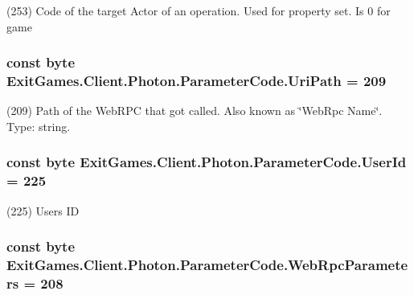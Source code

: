 (253) Code of the target Actor of an operation. Used for property set. Is 0 for game

\subsubsection[{\texorpdfstring{Uri\+Path}{UriPath}}]{\setlength{\rightskip}{0pt plus 5cm}const byte Exit\+Games.\+Client.\+Photon.\+Parameter\+Code.\+Uri\+Path = 209}\hypertarget{class_exit_games_1_1_client_1_1_photon_1_1_parameter_code_a2283a31554fd7e99130958b622aabb8e}{}\label{class_exit_games_1_1_client_1_1_photon_1_1_parameter_code_a2283a31554fd7e99130958b622aabb8e}


(209) Path of the Web\+R\+PC that got called. Also known as \char`\"{}\+Web\+Rpc Name\char`\"{}. Type\+: string.

\subsubsection[{\texorpdfstring{User\+Id}{UserId}}]{\setlength{\rightskip}{0pt plus 5cm}const byte Exit\+Games.\+Client.\+Photon.\+Parameter\+Code.\+User\+Id = 225}\hypertarget{class_exit_games_1_1_client_1_1_photon_1_1_parameter_code_a661b2eb09801e8a113253f52615bcb00}{}\label{class_exit_games_1_1_client_1_1_photon_1_1_parameter_code_a661b2eb09801e8a113253f52615bcb00}


(225) User\textquotesingle{}s ID

\subsubsection[{\texorpdfstring{Web\+Rpc\+Parameters}{WebRpcParameters}}]{\setlength{\rightskip}{0pt plus 5cm}const byte Exit\+Games.\+Client.\+Photon.\+Parameter\+Code.\+Web\+Rpc\+Parameters = 208}\hypertarget{class_exit_games_1_1_client_1_1_photon_1_1_parameter_code_a878eff4bd7eff73e35a277b64efe5d21}{}\label{class_exit_games_1_1_client_1_1_photon_1_1_parameter_code_a878eff4bd7eff73e35a277b64efe5d21}


